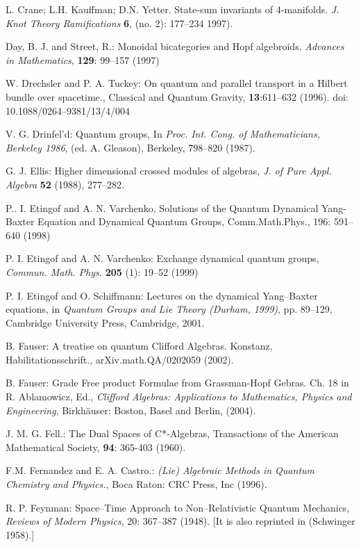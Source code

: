 \documentclass[12pt]{article}
\theoremstyle{plain}
\theoremstyle{definition}
\numberwithin{equation}{section}
\newcommand{\<}{{\langle}}
\begin{document}
\begin{thebibliography}{99}
L. Crane; L.H. Kauffman; D.N. Yetter. State-sum invariants of 4-manifolds. 
\textit{J. Knot Theory Ramifications} \textbf{6}, (no. 2): 177--234 1997).

Day, B. J. and Street, R.: Monoidal bicategories and Hopf algebroids. \textit{Advances in Mathematics}, \textbf{129}: 99--157 (1997)

W. Drechsler and P. A. Tuckey:  On quantum and parallel transport in a Hilbert bundle over spacetime., Classical and Quantum Gravity, \textbf{13}:611--632 (1996). doi: 10.1088/0264--9381/13/4/004

V. G. Drinfel'd: Quantum groups, In \emph{Proc. Int. Cong. of Mathematicians, Berkeley 1986}, (ed. A. Gleason), Berkeley, 798--820 (1987).

G. J. Ellis: Higher dimensional crossed modules of algebras,
\emph{J. of Pure Appl. Algebra} \textbf{52} (1988), 277--282.

P.. I. Etingof and A. N. Varchenko, Solutions of the Quantum Dynamical Yang-Baxter Equation and Dynamical Quantum Groups, Comm.Math.Phys., 196:  591--640 (1998)

P. I. Etingof and A. N. Varchenko: Exchange dynamical quantum
groups, \emph{Commun. Math. Phys.} \textbf{205} (1): 19--52 (1999)

P. I. Etingof and O. Schiffmann: Lectures on the dynamical Yang--Baxter equations, in \emph{Quantum Groups and Lie Theory (Durham, 1999)}, pp. 89--129, Cambridge University Press, Cambridge, 2001.


B. Fauser: A treatise on quantum Clifford Algebras. Konstanz, Habilitationsschrift., arXiv.math.QA/0202059 (2002).

B. Fauser: Grade Free product Formulae from Grassman-Hopf Gebras.
Ch. 18 in R. Ablamowicz, Ed., \emph{Clifford Algebras: Applications to Mathematics, Physics and Engineering},
Birkh\"{a}user: Boston, Basel and Berlin, (2004).

J. M. G. Fell.: The Dual Spaces of  C*-Algebras, Transactions of the American
Mathematical Society, \textbf{94}: 365-403 (1960).

F.M. Fernandez and E. A. Castro.:  \textit{(Lie) Algebraic Methods in Quantum Chemistry and Physics.}, Boca Raton: CRC Press, Inc  (1996).

 R. P. Feynman: Space--Time Approach to Non--Relativistic Quantum Mechanics, 
\emph{Reviews of Modern Physics}, 20: 367--387 (1948). [It is also reprinted in (Schwinger 1958).]


\end{thebibliography}
\end{document}
